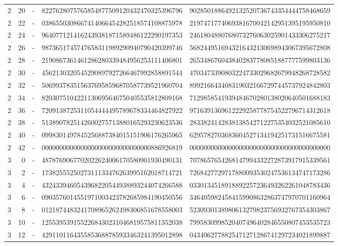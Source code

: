 \begin{longtable}{rrrll}
2 & 20 & - & 8227628075765854877509120432470325396796 & 9028501886492132520736743354444758468659 \\
2 & 22 & - & 0386550308667414066454282518574108875978 & 2197471774069381670042142951395195950810 \\
2 & 24 & - & 9640771214162439381871589486122290197353 & 2461804880768073276063025901433306275217 \\
2 & 26 & - & 9873651745747658311989290940790420399746 & 5682449516943216432130698943067395672808 \\
2 & 28 & - & 2190867361461286280339484956253111406801 & 2653486760438402837780851887777599803136 \\
2 & 30 & - & 4562130320545290897927266467992858891544 & 4703473390803224733029682679948268728582 \\
2 & 32 & - & 5069937835156376958596870587739521960704 & 8992166434083190321667297445737924842803 \\
2 & 34 & - & 8203075104221130695646750405535812809168 & 7129858541939484670280138020640501688183 \\
2 & 36 & - & 7209138725311054444495789678334464827922 & 9716391369612229258778754522796714312618 \\
2 & 38 & - & 5138907825142600275713880165293230623536 & 2833824142838138542712275354032521085610 \\
2 & 40 & - & 0998301497845256887384015151906176265965 & 6295782703683604527134194251731516675581 \\
2 & 42 & - & 0000000000000000000000000000000886926819 & 0000000000000000000000000000000000000000 \\
3 & 0 & - & 4878769067702022624006170580901930490131 & 7078657654268147994332272873917915339561 \\
3 & 2 & - & 1738255525027311133476263995162018714721 & 7268427729717880093530247536134747173286 \\
3 & 4 & - & 4324339460543968220544938893244074266588 & 0330134518918892257236493262261048783436 \\
3 & 6 & - & 0903576014551971003423782685984190450556 & 3464059824584159908632863747970701160964 \\
3 & 8 & - & 0121874483241708965262498306851678558003 & 5230930138980613279823756932767354303867 \\
3 & 10 & - & 1255395391552268430231046819575811352038 & 7995830998520407496402846550807453535723 \\
3 & 12 & - & 4291101164355853688785933463241395012898 & 0434062778825471271286741297234021899887 \\

\end{longtable}
